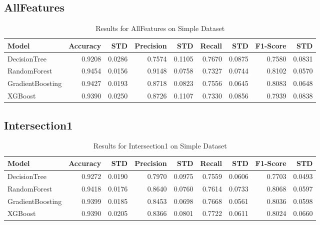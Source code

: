\documentclass{article}
\begin{document}
\subsection{AllFeatures}
\begin{table}[h!]
\centering
\caption{Results for AllFeatures on Simple Dataset}
\begin{tabular}{l|rr|rr|rr|rr}
\hline
Model & Accuracy & STD & Precision & STD & Recall & STD & F1-Score & STD \\
\hline
DecisionTree & 0.9208 & 0.0286 & 0.7574 & 0.1105 & 0.7670 & 0.0875 & 0.7580 & 0.0831 \\
RandomForest & 0.9454 & 0.0156 & 0.9148 & 0.0758 & 0.7327 & 0.0744 & 0.8102 & 0.0570 \\
GradientBoosting & 0.9427 & 0.0193 & 0.8718 & 0.0823 & 0.7556 & 0.0645 & 0.8083 & 0.0648 \\
XGBoost & 0.9390 & 0.0250 & 0.8726 & 0.1107 & 0.7330 & 0.0856 & 0.7939 & 0.0838 \\
\hline
\end{tabular}
\end{table}

\subsection{Intersection1}
\begin{table}[h!]
\centering
\caption{Results for Intersection1 on Simple Dataset}
\begin{tabular}{l|rr|rr|rr|rr}
\hline
Model & Accuracy & STD & Precision & STD & Recall & STD & F1-Score & STD \\
\hline
DecisionTree & 0.9272 & 0.0190 & 0.7970 & 0.0975 & 0.7559 & 0.0606 & 0.7703 & 0.0493 \\
RandomForest & 0.9418 & 0.0176 & 0.8640 & 0.0760 & 0.7614 & 0.0733 & 0.8068 & 0.0597 \\
GradientBoosting & 0.9399 & 0.0185 & 0.8453 & 0.0698 & 0.7668 & 0.0561 & 0.8036 & 0.0598 \\
XGBoost & 0.9390 & 0.0205 & 0.8366 & 0.0801 & 0.7722 & 0.0611 & 0.8024 & 0.0660 \\
\hline
\end{tabular}
\end{table}
\end{document}
